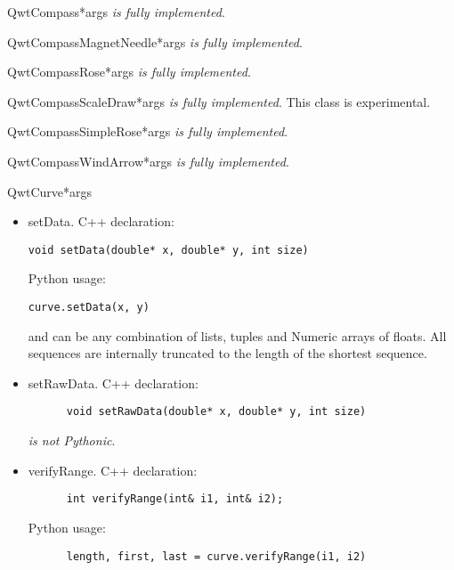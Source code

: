 \documentclass{manual}
\begin{document}
\begin{classdesc}{QwtCompass}{*args}
\emph{is fully implemented}.
\end{classdesc}

\begin{classdesc}{QwtCompassMagnetNeedle}{*args}
\emph{is fully implemented}.
\end{classdesc}

\begin{classdesc}{QwtCompassRose}{*args}
\emph{is fully implemented}.
\end{classdesc}

\begin{classdesc}{QwtCompassScaleDraw}{*args}
\emph{is fully implemented}. This class is experimental.
\end{classdesc}

\begin{classdesc}{QwtCompassSimpleRose}{*args}
\emph{is fully implemented}.
\end{classdesc}

\begin{classdesc}{QwtCompassWindArrow}{*args}
\emph{is fully implemented}.
\end{classdesc}

\begin{classdesc}{QwtCurve}{*args}

  \begin{itemize}

    \item{setData}. C++ declaration:
      \begin{verbatim}
void setData(double* x, double* y, int size)
      \end{verbatim}
      Python usage:
      \begin{verbatim}
curve.setData(x, y)
      \end{verbatim}
       and  can be any combination of lists, tuples and Numeric
      arrays of floats.
      All sequences are internally truncated to the length of the shortest
      sequence.

    \item{setRawData}. C++ declaration:
      \begin{verbatim}
      void setRawData(double* x, double* y, int size)
      \end{verbatim}
       \emph{is not Pythonic}.

    \item{verifyRange}. C++ declaration:
      \begin{verbatim}
      int verifyRange(int& i1, int& i2);
      \end{verbatim}
      Python usage:
      \begin{verbatim}
      length, first, last = curve.verifyRange(i1, i2)
      \end{verbatim}

  \end{itemize}
\end{classdesc}
\end{document}
